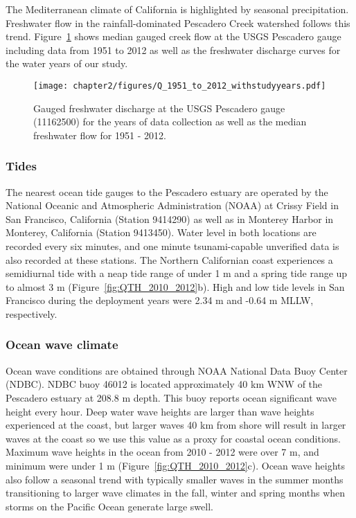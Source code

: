 The Mediterranean climate of California is highlighted by seasonal precipitation. Freshwater flow in the rainfall-dominated Pescadero Creek watershed follows this trend. Figure~\ref{fig:Q_1951_2012} shows median gauged creek flow at the USGS Pescadero gauge including data from 1951 to 2012 as well as the freshwater discharge curves for the water years of our study. 

\begin{figure}
	\begin{center}
		\texttt{[image: chapter2/figures/Q\_1951\_to\_2012\_withstudyyears.pdf]} \caption{Gauged freshwater discharge at the USGS Pescadero gauge (11162500) for the years of data collection as well as the median freshwater flow for 1951 - 2012.}\label{fig:Q_1951_2012}
	\end{center}
\end{figure}

\subsubsection{Tides}
The nearest ocean tide gauges to the Pescadero estuary are operated by the National Oceanic and Atmospheric Administration (NOAA) at Crissy Field in San Francisco, California (Station 9414290) as well as in Monterey Harbor in Monterey, California (Station 9413450). Water level in both locations are recorded every six minutes, and one minute tsunami-capable unverified data is also recorded at these stations. The Northern Californian coast experiences a semidiurnal tide with a neap tide range of under 1 m and a spring tide range up to almost 3 m (Figure~\ref{fig:QTH_2010_2012}b). High and low tide levels in San Francisco during the deployment years were 2.34 m and -0.64 m MLLW, respectively. 

\subsubsection{Ocean wave climate}
Ocean wave conditions are obtained through NOAA National Data Buoy Center (NDBC). NDBC buoy 46012 is located approximately 40 km WNW of the Pescadero estuary at 208.8 m depth. This buoy reports ocean significant wave height every hour. Deep water wave heights are larger than wave heights experienced at the coast, but larger waves 40 km from shore will result in larger waves at the coast so we use this value as a proxy for coastal ocean conditions. Maximum wave heights in the ocean from 2010 - 2012 were over 7 m, and minimum were under 1 m (Figure~\ref{fig:QTH_2010_2012}c). Ocean wave heights also follow a seasonal trend with typically smaller waves in the summer months transitioning to larger wave climates in the fall, winter and spring months when storms on the Pacific Ocean generate large swell.

